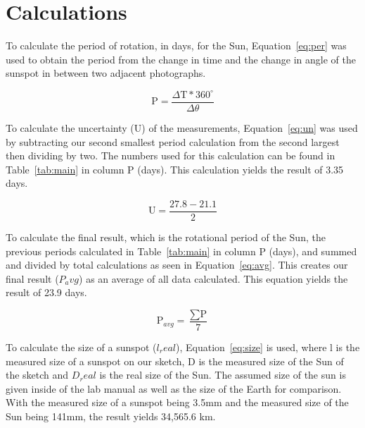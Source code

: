 \documentclass{article}
\begin{document}

\section{Calculations}
\label{sec:calc}

To calculate the period of rotation, in days, for the Sun, Equation~\ref{eq:per} was used to obtain the period from
the change in time and the change in angle of the sunspot in between two adjacent photographs.

\begin{equation}
\label{eq:per}
\text{P} = \frac{\Delta\text{T} * 360^\circ}{\Delta\theta}
\end{equation}

To calculate the uncertainty (U) of the measurements, Equation~\ref{eq:un} was used by subtracting our second 
smallest period calculation from the second largest then dividing by two. The numbers used for this calculation
can be found in Table~\ref{tab:main} in column P (days). This calculation yields the result of 3.35 days.

\begin{equation}
\label{eq:un}
\text{U} = \frac{27.8 - 21.1}{2}
\end{equation}

To calculate the final result, which is the rotational period of the Sun, the previous periods calculated in 
Table~\ref{tab:main} in column P (days), and summed and divided by total calculations as seen in
Equation~\ref{eq:avg}. This creates our final result ($P_avg$) as an average of all data calculated. This
equation yields the result of 23.9 days.

\begin{equation}
\label{eq:avg}
\text{P}_{avg} = \frac{\sum\text{P}}{7}
\end{equation}

To calculate the size of a sunspot ($l_real$), Equation~\ref{eq:size} is used, where l is the measured size of
a sunspot on our sketch, D is the measured size of the Sun of the sketch and $D_real$ is the real size of
the Sun. The assumed size of the sun is given inside of the lab manual as well as the size of the Earth for comparison.
With the measured size of a sunspot being 3.5mm and the measured size of the Sun being 141mm, the 
result yields 34,565.6 km.
\end{document}
